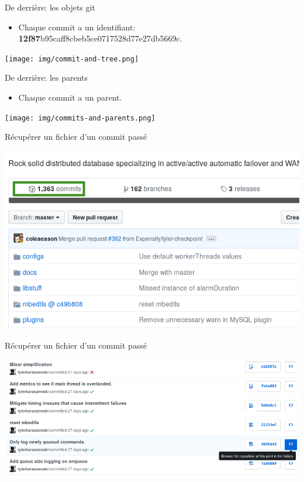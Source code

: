 \documentclass{beamer}
\begin{document}
\begin{frame}{De derrière: les objets git}
    \begin{itemize}
        \item Chaque commit a un identifiant: \textbf{12f87}b95caff8cbeb5ce0717528d77e27db5669c.
    \end{itemize}
    \begin{center}
    \texttt{[image: img/commit-and-tree.png]}
    \end{center}
\end{frame}

\begin{frame}{De derrière: les parents}
    \begin{itemize}
        \item Chaque commit a un parent.
    \end{itemize}
    \texttt{[image: img/commits-and-parents.png]}
\end{frame}

\begin{frame}{Récupérer un fichier d'un commit passé}
    \begin{center}
    	\includegraphics[scale=0.5]{img/rollback_1.png}
    \end{center}
\end{frame}

\begin{frame}{Récupérer un fichier d'un commit passé}
    \begin{center}
    	\includegraphics[scale=0.3]{img/rollback_2.png}
    \end{center}
\end{frame}
\end{document}
